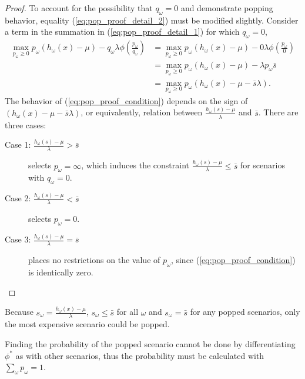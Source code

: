 \documentclass[ijoc,nonblindrev]{informs3} %
\begin{document}
\begin{proof}
	To account for the possibility that $q_\omega = 0$ and demonstrate popping behavior, equality (\ref{eq:pop_proof_detail_2}) must be modified slightly.
	Consider a term in the summation in (\ref{eq:pop_proof_detail_1}) for which $q_\omega = 0$,
	\begin{align}
		\max_{p_\omega \geq 0} p_\omega (h_\omega(x) - \mu) - q_\omega \lambda \phi\left(\frac{p_\omega}{q_\omega}\right) & = \max_{p_\omega \geq 0} p_\omega (h_\omega(x) - \mu) - 0 \lambda \phi\left(\frac{p_\omega}{0}\right) \nonumber \\
		& = \max_{p_\omega \geq 0} p_\omega (h_\omega(x) - \mu) - \lambda p_\omega \bar{s} \nonumber \\
		& = \max_{p_\omega \geq 0} p_\omega \left( h_\omega(x) - \mu - \bar{s} \lambda \right). \label{eq:pop_proof_condition}
	\end{align}
	The behavior of (\ref{eq:pop_proof_condition}) depends on the sign of $\left( h_\omega(x) - \mu - \bar{s} \lambda \right)$, or equivalently, relation between $\frac{h_\omega(s) - \mu}{\lambda}$ and $\bar{s}$.
	There are three cases:
	\begin{description}
		\item[Case 1: $\frac{h_\omega(s) - \mu}{\lambda} > \bar{s}$] selects $p_\omega = \infty$, which induces the constraint $\frac{h_\omega(s) - \mu}{\lambda} \leq \bar{s}$ for scenarios with $q_\omega = 0$.
		\item[Case 2: $\frac{h_\omega(s) - \mu}{\lambda} < \bar{s}$] selects $p_\omega = 0$.
		\item[Case 3: $\frac{h_\omega(s) - \mu}{\lambda} = \bar{s}$] places no restrictions on the value of $p_\omega$, since (\ref{eq:pop_proof_condition}) is identically zero. %
	\end{description}
\end{proof}

\begin{remark}
	Because $s_\omega = \frac{h_\omega(x) - \mu}{\lambda}$, $s_\omega \leq \bar{s}$ for all $\omega$ and $s_\omega = \bar{s}$ for any popped scenarios, only the most expensive scenario could be popped.
\end{remark}

\begin{remark}
	Finding the probability of the popped scenario cannot be done by differentiating $\phi^*$ as with other scenarios, thus the probability must be calculated with $\sum_\omega p_\omega = 1$.
\end{remark}
\end{document}
